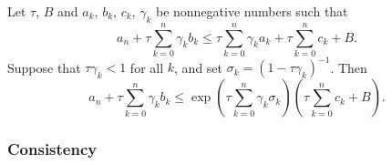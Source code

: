 \documentclass{siamart250211}
\begin{document}
\begin{lemma}
Let $\tau$, $B$ and $a_k$, $b_k$, $c_k$, $\gamma_k$ be nonnegative numbers such that
\begin{equation*}
	a_n + \tau \sum_{k = 0}^n \gamma_k b_k \le \tau \sum_{k = 0}^n \gamma_k a_k + \tau \sum_{k = 0}^n c_k + B.
	\end{equation*}
	Suppose that $\tau\gamma_k < 1$ for all $k$, and set $\sigma_k = ( 1- \tau\gamma_k )^{-1}$. Then 
	\begin{equation*}
	a_n + \tau \sum_{k = 0}^n \gamma_k b_k \le \exp\left( \tau \sum_{k =0}^n \gamma_k \sigma_k \right)\left( \tau\sum_{k = 0}^n c_k + B \right).
 \end{equation*}
\end{lemma}

\subsubsection{Consistency}
\end{document}
